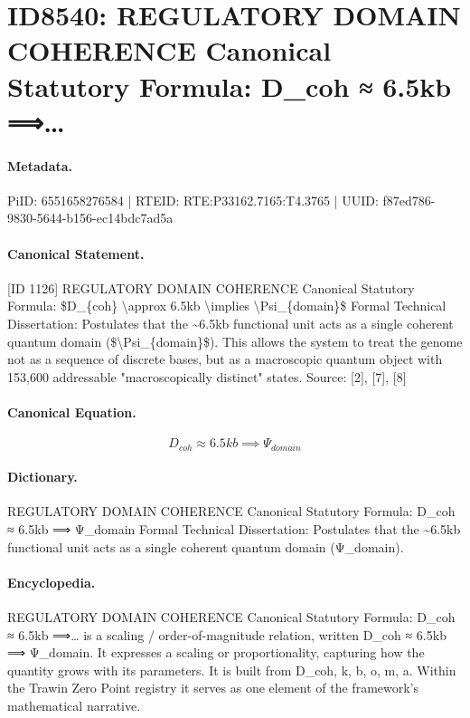 \section*{ID8540: REGULATORY DOMAIN COHERENCE Canonical Statutory Formula: D\_coh ≈ 6.5kb ⟹…}
\paragraph{Metadata.}
PiID: 6551658276584 | RTEID: RTE:P33162.7165:T4.3765 | UUID: f87ed786-9830-5644-b156-ec14bdc7ad5a

\paragraph{Canonical Statement.}
[ID 1126] REGULATORY DOMAIN COHERENCE Canonical Statutory Formula: \$D\_\{coh\} \textbackslash{}approx 6.5kb \textbackslash{}implies \textbackslash{}Psi\_\{domain\}\$ Formal Technical Dissertation: Postulates that the \textasciitilde{}6.5kb functional unit acts as a single coherent quantum domain (\$\textbackslash{}Psi\_\{domain\}\$). This allows the system to treat the genome not as a sequence of discrete bases, but as a macroscopic quantum object with 153,600 addressable "macroscopically distinct" states. Source: [2], [7], [8]

\paragraph{Canonical Equation.}
\[
D_{coh} \approx 6.5kb \implies \Psi_{domain}
\]

\paragraph{Dictionary.}
REGULATORY DOMAIN COHERENCE Canonical Statutory Formula: D\_coh ≈ 6.5kb ⟹ Ψ\_domain Formal Technical Dissertation: Postulates that the \textasciitilde{}6.5kb functional unit acts as a single coherent quantum domain (Ψ\_domain).

\paragraph{Encyclopedia.}
REGULATORY DOMAIN COHERENCE Canonical Statutory Formula: D\_coh ≈ 6.5kb ⟹… is a scaling / order-of-magnitude relation, written D\_coh ≈ 6.5kb ⟹ Ψ\_domain. It expresses a scaling or proportionality, capturing how the quantity grows with its parameters. It is built from D\_coh, k, b, o, m, a. Within the Trawin Zero Point registry it serves as one element of the framework's mathematical narrative.
